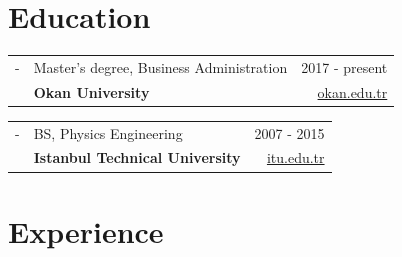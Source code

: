 \documentclass[11pt,a4paper]{article}
\renewenvironment{itemize}{
  \begin{list}{}{
    \setlength{\leftmargin}{0em}
  }
}{
  \end{list}
}
\begin{document}
\section*{Education}
\begin{itemize}
\item
\begin{tabularx}{\textwidth}{ l X r }
- & Master's degree, Business Administration & 2017 - present \\
& \textbf{Okan University} & \href{http://www.okan.edu.tr/en/}{okan.edu.tr}
\end{tabularx}
\item
\begin{tabularx}{\textwidth}{ l X r }
- & BS, Physics Engineering & 2007 - 2015 \\
& \textbf{Istanbul Technical University} & \href{http://www.itu.edu.tr/en/}{itu.edu.tr}
\end{tabularx}
\end{itemize}

\section*{Experience}
\end{document}
